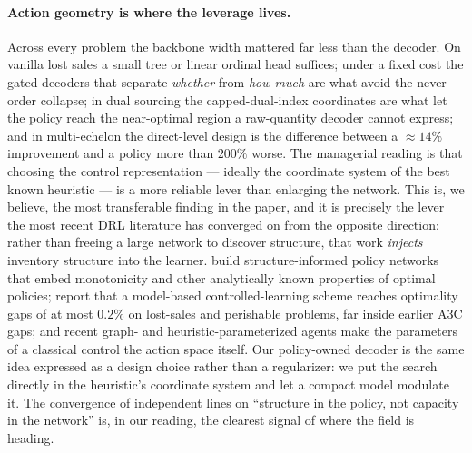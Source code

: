 \paragraph{Action geometry is where the leverage lives.}
Across every problem the backbone width mattered far less than the decoder. On vanilla lost sales a
small tree or linear ordinal head suffices; under a fixed cost the gated decoders that separate
\emph{whether} from \emph{how much} are what avoid the never-order collapse; in dual sourcing the
capped-dual-index coordinates are what let the policy reach the near-optimal region a raw-quantity
decoder cannot express; and in multi-echelon the direct-level design is the difference between a
$\approx 14\%$ improvement and a policy more than $200\%$ worse. The managerial reading is that
choosing the control representation --- ideally the coordinate system of the best known heuristic ---
is a more reliable lever than enlarging the network. This is, we believe, the most transferable
finding in the paper, and it is precisely the lever the most recent DRL literature has converged on
from the opposite direction: rather than freeing a large network to discover structure, that work
\emph{injects} inventory structure into the learner. \citet{maggiar2025structure} build
structure-informed policy networks that embed monotonicity and other analytically known properties of
optimal policies; \citet{temizoz2025dcl} report that a model-based controlled-learning scheme reaches
optimality gaps of at most $0.2\%$ on lost-sales and perishable problems, far inside earlier A3C gaps;
and recent graph- and heuristic-parameterized agents make the parameters of a classical control the
action space itself. Our policy-owned decoder is the same idea expressed as a design choice rather
than a regularizer: we put the search directly in the heuristic's coordinate system and let a compact
model modulate it. The convergence of independent lines on ``structure in the policy, not capacity in
the network'' is, in our reading, the clearest signal of where the field is heading.

